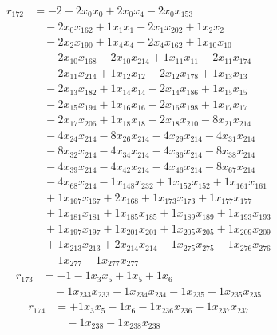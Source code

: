 \[\begin{aligned}
r_{172} &= - 2 + 2 x_{0} x_{0} + 2 x_{0} x_{4} - 2 x_{0} x_{153} \\
 &\quad - 2 x_{0} x_{162} + 1 x_{1} x_{1} - 2 x_{1} x_{202} + 1 x_{2} x_{2} \\
 &\quad - 2 x_{2} x_{190} + 1 x_{4} x_{4} - 2 x_{4} x_{162} + 1 x_{10} x_{10} \\
 &\quad - 2 x_{10} x_{168} - 2 x_{10} x_{214} + 1 x_{11} x_{11} - 2 x_{11} x_{174} \\
 &\quad - 2 x_{11} x_{214} + 1 x_{12} x_{12} - 2 x_{12} x_{178} + 1 x_{13} x_{13} \\
 &\quad - 2 x_{13} x_{182} + 1 x_{14} x_{14} - 2 x_{14} x_{186} + 1 x_{15} x_{15} \\
 &\quad - 2 x_{15} x_{194} + 1 x_{16} x_{16} - 2 x_{16} x_{198} + 1 x_{17} x_{17} \\
 &\quad - 2 x_{17} x_{206} + 1 x_{18} x_{18} - 2 x_{18} x_{210} - 8 x_{21} x_{214} \\
 &\quad - 4 x_{24} x_{214} - 8 x_{26} x_{214} - 4 x_{29} x_{214} - 4 x_{31} x_{214} \\
 &\quad - 8 x_{32} x_{214} - 4 x_{34} x_{214} - 4 x_{36} x_{214} - 8 x_{38} x_{214} \\
 &\quad - 4 x_{39} x_{214} - 4 x_{42} x_{214} - 4 x_{46} x_{214} - 8 x_{67} x_{214} \\
 &\quad - 4 x_{68} x_{214} - 1 x_{148} x_{232} + 1 x_{152} x_{152} + 1 x_{161} x_{161} \\
 &\quad + 1 x_{167} x_{167} + 2 x_{168} + 1 x_{173} x_{173} + 1 x_{177} x_{177} \\
 &\quad + 1 x_{181} x_{181} + 1 x_{185} x_{185} + 1 x_{189} x_{189} + 1 x_{193} x_{193} \\
 &\quad + 1 x_{197} x_{197} + 1 x_{201} x_{201} + 1 x_{205} x_{205} + 1 x_{209} x_{209} \\
 &\quad + 1 x_{213} x_{213} + 2 x_{214} x_{214} - 1 x_{275} x_{275} - 1 x_{276} x_{276} \\
 &\quad - 1 x_{277} - 1 x_{277} x_{277}
\end{aligned}\]
\[\begin{aligned}
r_{173} &= - 1 - 1 x_{3} x_{5} + 1 x_{5} + 1 x_{6} \\
 &\quad - 1 x_{233} x_{233} - 1 x_{234} x_{234} - 1 x_{235} - 1 x_{235} x_{235}
\end{aligned}\]
\[\begin{aligned}
r_{174} &= + 1 x_{3} x_{5} - 1 x_{6} - 1 x_{236} x_{236} - 1 x_{237} x_{237} \\
 &\quad - 1 x_{238} - 1 x_{238} x_{238}
\end{aligned}\]
